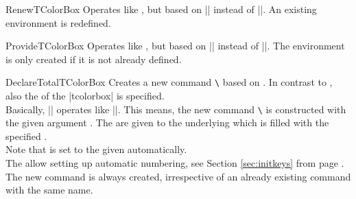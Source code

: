 \begin{docCommand}{RenewTColorBox}{}
  Operates like , but based on |\RenewDocumentEnvironment| instead of |\DeclareDocumentEnvironment|.
  An existing environment is redefined.
\end{docCommand}

\begin{docCommand}{ProvideTColorBox}{}
  Operates like , but based on |\ProvideDocumentEnvironment| instead of |\DeclareDocumentEnvironment|.
  The environment  is only created if it is not already defined.
\end{docCommand}


\clearpage

\begin{docCommand}{DeclareTotalTColorBox}{}
  Creates a new command \texttt{\textbackslash} based on .
  In contrast to , also the  of the |tcolorbox| is specified.\\
  Basically, |\DeclareTotalTColorBox| operates like |\DeclareDocumentCommand|. This means,
  the new command \texttt{\textbackslash} is constructed with the given argument .
  The  are given to the underlying  which is filled with
  the specified .\\
  Note that  is set to the given 
  automatically.\\
  The  allow setting up automatic numbering,
  see Section \ref{sec:initkeys} from page \pageref{sec:initkeys}.\\
  The new command is always created, irrespective of an already existing
  command with the same name.

\end{docCommand}

